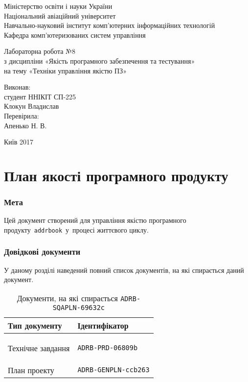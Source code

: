 \documentclass[a4paper,oneside,DIV=12,12pt]{scrartcl}
\newcommand{\progname}{\texttt{addrbook}}
\newcommand{\theprogcode}{ADRB}
\newcommand{\theqaplan}{SQAPLN}
\newcommand{\theqaplanhash}{69632c}
\newcommand{\thegenplan}{GENPLN}
\newcommand{\thegenplanhash}{ccb263}
\newcommand{\theprd}{PRD}
\newcommand{\theprdhash}{06809b}
\newcommand{\printqaplan}{\texttt{\theprogcode-\theqaplan-\theqaplanhash}}
\newcommand{\printgenplan}{\texttt{\theprogcode-\thegenplan-\thegenplanhash}}
\newcommand{\printprd}{\texttt{\theprogcode-\theprd-\theprdhash}}
\begin{document}
	\begin{titlepage}
    \begin{center}
	Міністерство освіти і науки України\\
	Національний авіаційний університет\\
	Навчально-науковий інститут комп'ютерних інформаційних технологій\\
	Кафедра комп'ютеризованих систем управління

	\vspace{\fill}

	Лабораторна робота №8\\
	з дисципліни «Якість програмного забезпечення та тестування»\\
	на тему «Техніки управління якістю ПЗ»

	\vspace{\fill}
	
	\begin{flushright}
		Виконав:\\
		студент ННІКІТ СП-225\\
		Клокун Владислав\\
		Перевірила:\\
		Апенько Н. В.
	\end{flushright}

	Київ 2017

    \end{center}
    \end{titlepage}
	
	\part{План якості програмного продукту}
		\section{Мета}
			Цей документ створений для управління якістю програмного продукту~\progname \ у~процесі життєвого циклу.
			
		\section{Довідкові документи}
			У даному розділі наведений повний список документів, на які спирається даний документ.
			
			\begin{longtable}[c]{ll}
				\toprule
				Тип документу & Ідентифікатор \\
				\midrule
				\endhead
				\bottomrule
				\caption{Документи, на які спирається \printqaplan}
				\endfoot
				\label{tab:reference-docs}
				
				Технічне завдання & \printprd \\
				План проекту & \printgenplan \\
			
			\end{longtable}
		
\end{document}
